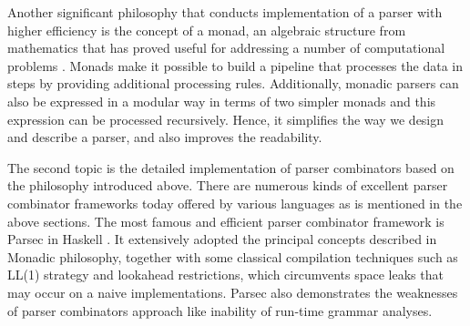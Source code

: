 Another significant philosophy that conducts implementation of a parser with higher efficiency is the concept of a monad, an algebraic structure from mathematics that has proved useful for addressing a number of computational problems \cite{Hutton:1996}. Monads make it possible to build a pipeline that processes the data in steps by providing additional processing rules. Additionally, monadic parsers can also be expressed in a modular way in terms of two simpler monads and this expression can be processed recursively. Hence, it simplifies the way we design and describe a parser, and also improves the readability.

The second topic is the detailed implementation of parser combinators based on the philosophy introduced above. There are numerous kinds of excellent parser combinator frameworks today offered by various languages as is mentioned in the above sections. The most famous and efficient parser combinator framework is Parsec in Haskell \cite{Fokker:1995}. It extensively adopted the principal concepts described in Monadic philosophy, together with some classical compilation techniques such as LL(1) strategy and lookahead restrictions, which circumvents space leaks that may occur on a naive implementations. Parsec also demonstrates the weaknesses of parser combinators approach like inability of run-time grammar analyses.

